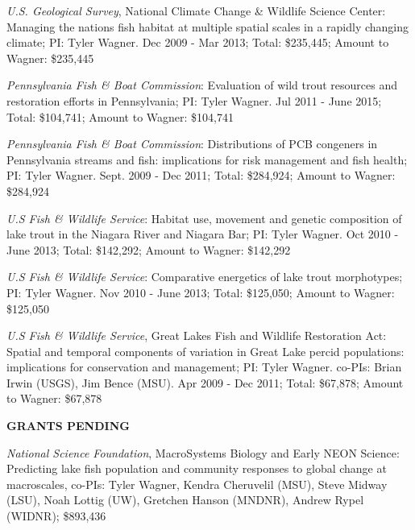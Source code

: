 \documentclass[10pt]{article}
\begin{document}
\begin{flushleft}
\begin{etaremune}
\item {\sl U.S. Geological Survey}, National Climate Change \& Wildlife Science Center: Managing the nations fish habitat at multiple spatial scales in a rapidly changing climate; PI: Tyler Wagner. Dec 2009 - Mar 2013; Total: \$235,445; Amount to Wagner: \$235,445

\item {\sl  Pennsylvania Fish \& Boat Commission}: Evaluation of wild trout resources and restoration efforts in Pennsylvania; PI: Tyler Wagner. Jul 2011 - June 2015; Total: \$104,741; Amount to Wagner: \$104,741

\item  {\sl  Pennsylvania Fish \& Boat Commission}: Distributions of PCB congeners in Pennsylvania streams and fish: implications for risk management and fish health; PI: Tyler Wagner. Sept. 2009 - Dec 2011; Total: \$284,924; Amount to Wagner: \$284,924

\item {\sl U.S Fish \& Wildlife Service}: Habitat use, movement and genetic composition of lake trout in the Niagara River and Niagara Bar; PI: Tyler Wagner. Oct 2010 - June 2013; Total: \$142,292;  Amount to Wagner: \$142,292

\item  {\sl U.S Fish \& Wildlife Service}: Comparative energetics of lake trout morphotypes; PI: Tyler Wagner. Nov 2010 - June 2013; Total: \$125,050; Amount to Wagner:  \$125,050

\item  {\sl U.S Fish \& Wildlife Service}, Great Lakes Fish and Wildlife Restoration Act: Spatial and temporal components of variation in Great Lake percid populations: implications for conservation and management; PI: Tyler Wagner. co-PIs: Brian Irwin (USGS), Jim Bence (MSU). Apr 2009 - Dec 2011; Total: \$67,878; Amount to Wagner: \$67,878
\end{etaremune}

\centerline {\bf{GRANTS PENDING}}
\vspace{5pt}
\begin{etaremune}
\item {\sl  National Science Foundation}, MacroSystems Biology and Early NEON Science: Predicting lake fish population and community responses to global change at macroscales, co-PIs: Tyler Wagner, Kendra Cheruvelil (MSU), Steve Midway (LSU), Noah Lottig (UW), Gretchen Hanson (MNDNR), Andrew Rypel (WIDNR); \$893,436
\end{etaremune}


\end{flushleft}
\end{document}
